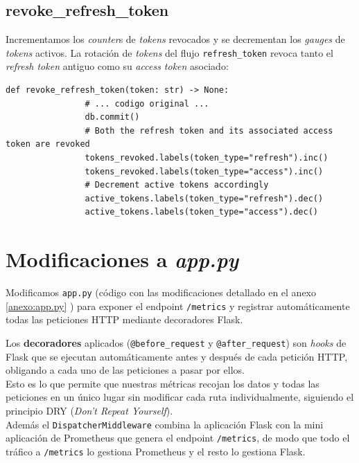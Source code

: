 \documentclass[12pt, a4paper]{article}
\begin{document}
		\subsection{revoke\_refresh\_token}
		
			Incrementamos los \textit{counter}s de \textit{tokens} revocados y se decrementan los \textit{gauges} de \textit{tokens} activos. La rotación de \textit{tokens }del flujo \texttt{refresh\_token} revoca tanto el \textit{refresh token }antiguo como su \textit{access token} asociado:
			
			\begin{lstlisting}[style=python, caption=Instrumentación de revoke\_refresh\_token]
				def revoke_refresh_token(token: str) -> None:
				# ... codigo original ...
				db.commit()
				# Both the refresh token and its associated access token are revoked
				tokens_revoked.labels(token_type="refresh").inc()
				tokens_revoked.labels(token_type="access").inc()
				# Decrement active tokens accordingly
				active_tokens.labels(token_type="refresh").dec()
				active_tokens.labels(token_type="access").dec()
			\end{lstlisting}
			
			
	\newpage
	\section{Modificaciones a\textit{ app.py}}
	
	
		Modificamos \texttt{app.py} (código con las modificaciones detallado en el anexo \ref{anexo:app.py} ) para exponer el endpoint \texttt{/metrics} y registrar automáticamente todas las peticiones HTTP mediante decoradores Flask.
		
		Los \textbf{decoradores} aplicados (\texttt{@before\_request} y \texttt{@after\_request}) son \textit{hooks} de Flask que se ejecutan automáticamente antes y después de cada petición HTTP,  obligando a cada uno de las peticiones a pasar por ellos.\\
		Esto es lo que permite que nuestras métricas recojan los datos y todas las peticiones en un único lugar sin modificar cada ruta individualmente, siguiendo el principio DRY (\textit{Don't Repeat Yourself}).\\
		Además el \texttt{DispatcherMiddleware} combina la aplicación Flask con la mini aplicación de Prometheus que genera el endpoint \texttt{/metrics}, de modo que todo el tráfico a \texttt{/metrics} lo gestiona Prometheus y el resto lo gestiona Flask.
		
\end{document}
